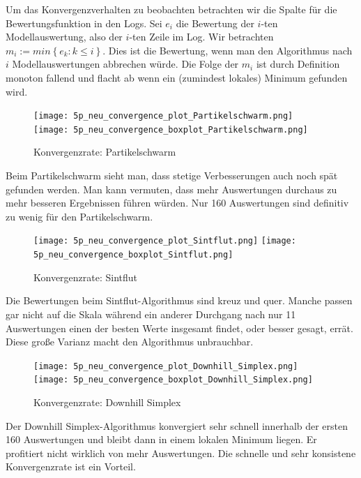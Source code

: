 \documentclass[a4paper,12pt]{article}
\begin{document}
Um das Konvergenzverhalten zu beobachten betrachten wir die Spalte für die Bewertungsfunktion in den Logs. Sei $e_i$ die Bewertung der $i$-ten Modellauswertung, also der $i$-ten Zeile im Log. Wir betrachten $m_i := min\left\{e_k:k\leq i\right\}$. Dies ist die Bewertung, wenn man den Algorithmus nach $i$ Modellauswertungen abbrechen würde. Die Folge der $m_i$ ist durch Definition monoton fallend und flacht ab wenn ein (zumindest lokales) Minimum gefunden wird. 

\begin{figure}[h]
\texttt{[image: 5p\_neu\_convergence\_plot\_Partikelschwarm.png]}
\texttt{[image: 5p\_neu\_convergence\_boxplot\_Partikelschwarm.png]}
\caption{Konvergenzrate: Partikelschwarm}
\end{figure}

Beim Partikelschwarm sieht man, dass stetige Verbesserungen auch noch spät gefunden werden. Man kann vermuten, dass mehr Auswertungen durchaus zu mehr besseren Ergebnissen führen würden. Nur 160 Auswertungen sind definitiv zu wenig für den Partikelschwarm. 

\begin{figure}[h]
\texttt{[image: 5p\_neu\_convergence\_plot\_Sintflut.png]}
\texttt{[image: 5p\_neu\_convergence\_boxplot\_Sintflut.png]}
\caption{Konvergenzrate: Sintflut}
\end{figure}

Die Bewertungen beim Sintflut-Algorithmus sind kreuz und quer. Manche passen gar nicht auf die Skala während ein anderer Durchgang nach nur 11 Auswertungen einen der besten Werte insgesamt findet, oder besser gesagt, errät. Diese große Varianz macht den Algorithmus unbrauchbar.

\begin{figure}[h]
\texttt{[image: 5p\_neu\_convergence\_plot\_Downhill\_Simplex.png]}
\texttt{[image: 5p\_neu\_convergence\_boxplot\_Downhill\_Simplex.png]}
\caption{Konvergenzrate: Downhill Simplex}
\end{figure}

Der Downhill Simplex-Algorithmus konvergiert sehr schnell innerhalb der ersten 160 Auswertungen und bleibt dann in einem lokalen Minimum liegen. Er profitiert nicht wirklich von mehr Auswertungen. Die schnelle und sehr konsistene Konvergenzrate ist ein Vorteil.
\end{document}
